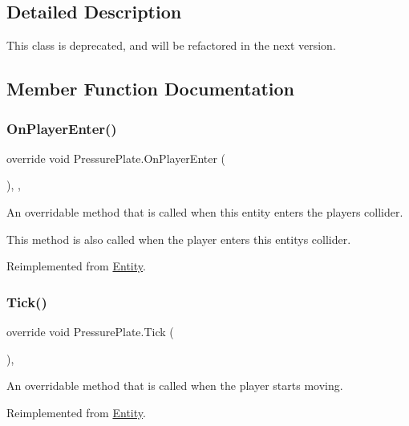 \subsection{Detailed Description}
This class is deprecated, and will be refactored in the next version. 



\subsection{Member Function Documentation}
\mbox{\label{class_pressure_plate_a859fa0ce4d9dcfdcc702593ae98afbb0}} 
\subsubsection{\texorpdfstring{On\+Player\+Enter()}{OnPlayerEnter()}}
{\footnotesize\ttfamily override void Pressure\+Plate.\+On\+Player\+Enter (\begin{DoxyParamCaption}{ }\end{DoxyParamCaption})\hspace{0.3cm}{\ttfamily [inline]}, {\ttfamily [protected]}, {\ttfamily [virtual]}}



An overridable method that is called when this entity enters the player\textquotesingle{}s collider. 

This method is also called when the player enters this entity\textquotesingle{}s collider. 

Reimplemented from \mbox{\hyperlink{class_entity_ad1e2bb09e463c33b64b26ba3306ba2d7}{Entity}}.

\mbox{\label{class_pressure_plate_a38ab73177e6bef277e62247d7f5fe2f8}} 
\subsubsection{\texorpdfstring{Tick()}{Tick()}}
{\footnotesize\ttfamily override void Pressure\+Plate.\+Tick (\begin{DoxyParamCaption}{ }\end{DoxyParamCaption})\hspace{0.3cm}{\ttfamily [inline]}, {\ttfamily [virtual]}}



An overridable method that is called when the player starts moving. 



Reimplemented from \mbox{\hyperlink{class_entity_a7a09da64c6d87cd1bce0bb69512d82fc}{Entity}}.


